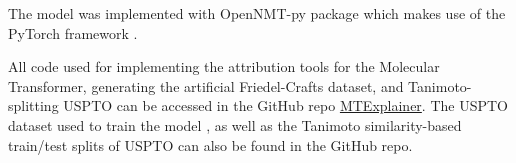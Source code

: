 The model was implemented with OpenNMT-py package \cite{Klein2017} which makes use of the PyTorch framework \cite{Paszke2019PyTorch:Library}. 

All code used for implementing the attribution tools for the Molecular Transformer, generating the artificial Friedel-Crafts dataset, and Tanimoto-splitting USPTO can be accessed in the GitHub repo \href{https://github.com/davkovacs/MTExplainer.git}{MTExplainer}\cite{Kovacs2020MolecularExplainer}. The USPTO dataset used to train the model \cite{Lowe2012, Jin2017}, as well as the Tanimoto similarity-based train/test splits of USPTO can also be found in the GitHub repo.